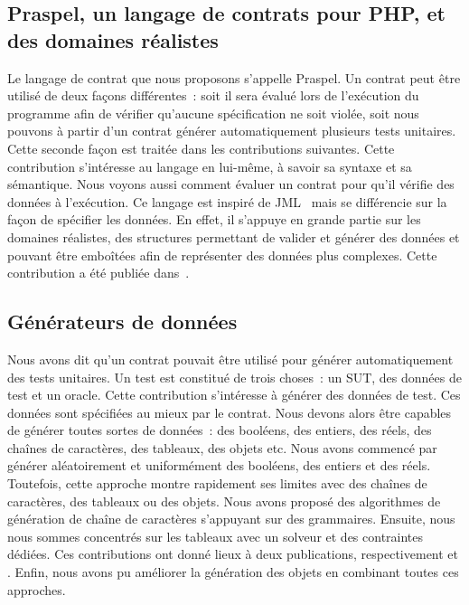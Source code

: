 \subsection{Praspel, un langage de contrats pour PHP, et des domaines réalistes}

Le langage de contrat que nous proposons s'appelle {\strong Praspel}. Un contrat
peut être utilisé de deux façons différentes~: soit il sera évalué lors de
l'exécution du programme afin de vérifier qu'aucune spécification ne soit
violée, soit nous pouvons à partir d'un contrat générer automatiquement
plusieurs tests unitaires. Cette seconde façon est traitée dans les
contributions suivantes.  Cette contribution s'intéresse au langage en lui-même,
à savoir sa syntaxe et sa sémantique. Nous voyons aussi comment évaluer un
contrat pour qu'il vérifie des données à l'exécution. Ce langage est inspiré de
JML~ mais se différencie sur la façon de spécifier les données. En
effet, il s'appuye en grande partie sur les {\strong domaines réalistes}, des
structures permettant de valider et générer des données et pouvant être
emboîtées afin de représenter des données plus complexes. Cette contribution a
été publiée dans~.

\subsection{Générateurs de données}

Nous avons dit qu'un contrat pouvait être utilisé pour générer automatiquement
des tests unitaires. Un test est constitué de trois choses~: un SUT, des données
de test et un oracle. Cette contribution s'intéresse à générer des données de
test. Ces données sont spécifiées au mieux par le contrat. Nous devons alors
être capables de générer toutes sortes de données~: des booléens, des entiers,
des réels, des chaînes de caractères, des tableaux, des objets etc. Nous avons
commencé par générer aléatoirement et uniformément des booléens, des entiers et
des réels. Toutefois, cette approche montre rapidement ses limites avec des
chaînes de caractères, des tableaux ou des objets. Nous avons proposé des
algorithmes de génération de chaîne de caractères s'appuyant sur des
grammaires. Ensuite, nous nous sommes concentrés sur les tableaux avec un
solveur et des contraintes dédiées. Ces contributions ont donné lieux à deux
publications, respectivement  et .
Enfin, nous avons pu améliorer la génération des objets en combinant toutes ces
approches.

